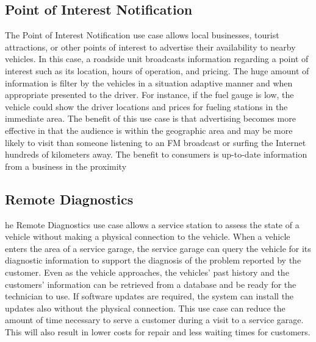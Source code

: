 \subsection{Point of Interest Notification}
The Point of Interest Notification use case allows local businesses, tourist attractions, or other points of interest to advertise their availability to nearby vehicles. In this case, a roadside unit broadcasts information regarding a point of interest such as its location, hours of operation, and pricing. The huge amount of information is filter by the vehicles in a situation adaptive manner and when appropriate presented to the driver. For instance, if the fuel gauge is low, the vehicle could show the driver locations and prices for fueling stations in the immediate area. The benefit of this use case is that advertising becomes more effective in that the audience is within the geographic area and may be more likely to visit than someone listening to an FM broadcast or surfing the Internet hundreds of kilometers away. The benefit to consumers is up-to-date information from a business in the proximity

\subsection{Remote Diagnostics}
he Remote Diagnostics use case allows a service station to assess the state of a vehicle without making a physical connection to the vehicle. When a vehicle enters the area of a service garage, the service garage can query the vehicle for its diagnostic information to support the diagnosis of the problem reported by the customer. Even as the vehicle approaches, the vehicles’ past history and the customers’ information can be retrieved from a database and be ready for the technician to use. If software updates are required, the system can install the updates also without the physical connection. This use case can reduce the amount of time necessary to serve a customer during a visit to a service garage. This will also result in lower costs for repair and less waiting times for customers.